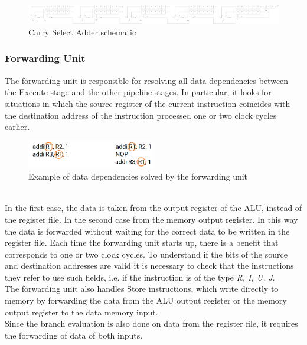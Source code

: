 \begin{figure}[H]
	\centering
	\includegraphics[width=1.1\textwidth]{sec2/images/CSA_full.png }
	\caption{Carry Select Adder schematic}
	\label{fig:CSA_full}
\end{figure}



\subsubsection{Forwarding Unit}
The forwarding unit is responsible for resolving all data dependencies between the Execute stage and the other pipeline stages. In particular, it looks for situations in which the source register of the current instruction coincides with the destination address of the instruction processed one or two clock cycles earlier.
\begin{figure}[htbp]
	\centering
	\includegraphics[width=0.5\textwidth]{sec2/images/data_dependency.png}
	\caption{Example of data dependencies solved by the forwarding unit}
	\label{fig:zero_skipping}
\end{figure}
\\In the first case, the data is taken from the output register of the ALU, instead of the register file. In the second case from the memory output register. In this way the data is forwarded without waiting for the correct data to be written in the register file. Each time the forwarding unit starts up, there is a benefit that corresponds to one or two clock cycles. To understand if the bits of the source and destination addresses are valid it is necessary to check that the instructions they refer to use such fields, i.e. if the instruction is of the type \textit{R, I, U, J}.\\
The forwarding unit also handles Store instructions, which write directly to memory by forwarding the data from the ALU output register or the memory output register to the data memory input.\\
Since the branch evaluation is also done on data from the register file, it requires the forwarding of data of both inputs.
